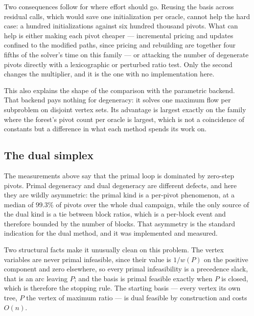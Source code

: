 Two consequences follow for where effort should go. Reusing the basis across
residual calls, which would save one initialization per oracle, cannot help the
hard case: a hundred initializations against six hundred thousand pivots. What
can help is either making each pivot cheaper --- incremental pricing and updates
confined to the modified paths, since pricing and rebuilding are together four
fifths of the solver's time on this family --- or attacking the number of
degenerate pivots directly with a lexicographic or perturbed ratio test. Only the
second changes the multiplier, and it is the one with no implementation here.

This also explains the shape of the comparison with the parametric backend. That
backend pays nothing for degeneracy: it solves one maximum flow per subproblem on
disjoint vertex sets. Its advantage is largest exactly on the family where the
forest's pivot count per oracle is largest, which is not a coincidence of
constants but a difference in what each method spends its work on.

\subsection{The dual simplex}
\label{sec:dual-results}


The measurements above say that the primal loop is dominated by zero-step
pivots. Primal degeneracy and dual degeneracy are different defects, and here
they are wildly asymmetric: the primal kind is a per-pivot phenomenon, at a
median of $99.3\%$ of pivots over the whole dual campaign, while the only source
of the dual kind is a tie between block ratios, which is a per-block event and
therefore bounded by the number of blocks. That asymmetry is the standard
indication for the dual method, and it was implemented and measured.

Two structural facts make it unusually clean on this problem. The vertex variables
are never primal infeasible, since their value is $1/w(P)$ on the positive
component and zero elsewhere, so every primal infeasibility is a precedence
slack, that is an arc leaving $P$; and the basis is primal feasible exactly when
$P$ is closed, which is therefore the stopping rule. The starting basis --- every
vertex its own tree, $P$ the vertex of maximum ratio --- is dual feasible by
construction and costs $O(n)$.



